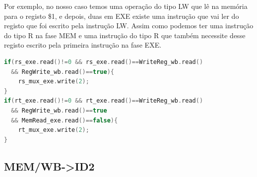 \documentclass[pdftex,12pt,a4paper]{report}
\begin{document}
Por exemplo, no nosso caso temos uma operação do tipo LW que lê na memória para o registo \$1, e depois, duas em EXE existe uma instrução que vai ler do registo que foi escrito pela instrução LW. Assim como podemos ter uma instrução do tipo R na fase MEM e uma instrução do tipo R que também necessite desse registo escrito pela primeira instrução na fase EXE. 

\begin{lstlisting}[language=c]
if(rs_exe.read()!=0 && rs_exe.read()==WriteReg_wb.read()
  && RegWrite_wb.read()==true){
    rs_mux_exe.write(2);
}
if(rt_exe.read()!=0 && rt_exe.read()==WriteReg_wb.read() 
  && RegWrite_wb.read()==true 
  && MemRead_exe.read()==false){
    rt_mux_exe.write(2);
}
\end{lstlisting} 

\subsection{MEM/WB->ID2}

\begin{table}[!htb]
\centering
\label{my-label}
\end{table}
\end{document}

